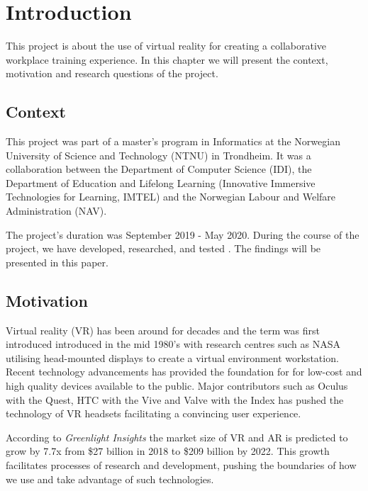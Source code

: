
\chapter{Introduction}

This project is about the use of virtual reality for creating a collaborative workplace training experience. In this chapter we will present the context, motivation and research questions of the project. 

\section{Context}
This project was part of a master's program in Informatics at the Norwegian University of Science and Technology (NTNU) in Trondheim. It was a collaboration between the Department of Computer Science (IDI), the Department of Education and Lifelong Learning (Innovative Immersive Technologies for Learning, IMTEL) and the Norwegian Labour and Welfare Administration (NAV). 

The project's duration was September 2019 - May 2020. During the course of the project, we have developed, researched, and tested .  The findings will be presented in this paper.

\section{Motivation}
Virtual reality (VR) has been around for decades and the term was first introduced introduced in the mid 1980's \cite{historyVR} with research centres such as NASA utilising head-mounted displays to create a virtual environment workstation. Recent technology advancements has provided the foundation for for low-cost and high quality devices available to the public. Major contributors such as Oculus with the Quest, HTC with the Vive and Valve with the Index has pushed the technology of VR headsets facilitating a convincing user experience.  

According to \textit{Greenlight Insights} \cite{forcastVR} the market size of VR and AR is predicted to grow by 7.7x from \$27 billion in 2018 to \$209 billion by 2022. This growth facilitates processes of research and development, pushing the boundaries of how we use and take advantage of such technologies.

